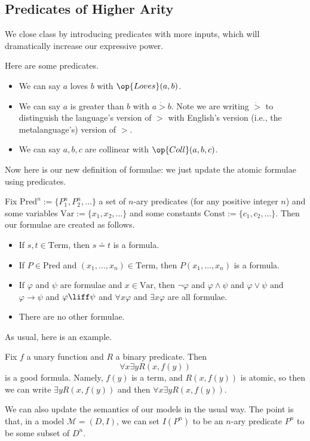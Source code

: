 \subsection{Predicates of Higher Arity}
We close class by introducing predicates with more inputs, which will dramatically increase our expressive power.
\begin{example}
	Here are some predicates.
	\begin{itemize}
		\item We can say $a$ loves $b$ with $\op{Loves}(a,b)$.
		\item We can say $a$ is greater than $b$ with $a\dot{{}>{}}b$. Note we are writing $\dot>$ to distinguish the language's version of $>$ with English's version (i.e., the metalanguage's) version of $>$.
		\item We can say $a,b,c$ are collinear with $\op{Coll}(a,b,c)$.
	\end{itemize}
\end{example}
Now here is our new definition of formulae: we just update the atomic formulae using predicates.
\begin{defi}
	Fix $\mathrm{Pred}^n:=\{P_1^n,P_2^n,\ldots\}$ a set of $n$-ary predicates (for any positive integer $n$) and some variables $\mathrm{Var}:=\{x_1,x_2,\ldots\}$ and some constants $\mathrm{Const}:=\{c_1,c_2,\ldots\}$. Then our formulae are created as follows.
	\begin{itemize}
		\item If $s,t\in\mathrm{Term}$, then $s\doteq t$ is a formula.
		\item If $P\in\mathrm{Pred}$ and $(x_1,\ldots,x_n)\in\mathrm{Term}$, then $P(x_1,\ldots,x_n)$ is a formula.
		\item If $\varphi$ and $\psi$ are formulae and $x\in\mathrm{Var}$, then $\lnot\varphi$ and $\varphi\land\psi$ and $\varphi\lor\psi$ and $\varphi\to\psi$ and $\varphi\liff\psi$ and $\forall x\varphi$ and $\exists x\varphi$ are all formulae.
		\item There are no other formulae.
	\end{itemize}
\end{defi}
As usual, here is an example.
\begin{example}
	Fix $f$ a unary function and $R$ a binary predicate. Then
	\[\forall x\exists yR(x,f(y))\]
	is a good formula. Namely, $f(y)$ is a term, and $R(x,f(y))$ is atomic, so then we can write $\exists yR(x,f(y))$ and then $\forall x\exists yR(x,f(y))$.
\end{example}
We can also update the semantics of our models in the usual way. The point is that, in a model $\mathcal M=(D,I)$, we can set $I(P^n)$ to be an $n$-ary predicate $P^n$ to be some subset of $D^n$.